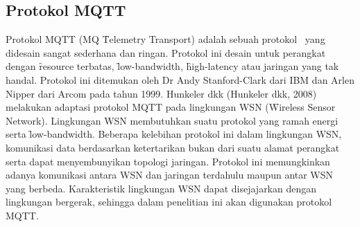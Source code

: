 


\subsection{Protokol MQTT}

Protokol MQTT (MQ \f{Telemetry Transport}) adalah sebuah protokol \pubsub~yang
didesain sangat sederhana dan ringan. Protokol ini desain untuk perangkat
dengan \f{resource} terbatas, \f{low-bandwidth}, \f{high-latency} atau jaringan
yang tak handal. Protokol ini ditemukan oleh Dr Andy Stanford-Clark dari IBM
dan Arlen Nipper dari Arcom pada tahun 1999. Hunkeler dkk (Hunkeler dkk, 2008)
melakukan adaptasi protokol MQTT pada lingkungan WSN (\f{Wireless Sensor
Network}). Lingkungan WSN membutuhkan suatu protokol yang ramah energi serta
\f{low-bandwidth}. Beberapa kelebihan protokol ini dalam lingkungan WSN,
komunikasi data berdasarkan ketertarikan bukan dari suatu alamat perangkat
serta dapat menyembunyikan topologi jaringan. Protokol ini memungkinkan adanya
komunikasi antara WSN dan jaringan terdahulu maupun antar WSN yang berbeda.
Karakteristik lingkungan WSN dapat disejajarkan dengan lingkungan bergerak,
sehingga dalam penelitian ini akan digunakan protokol MQTT. 

